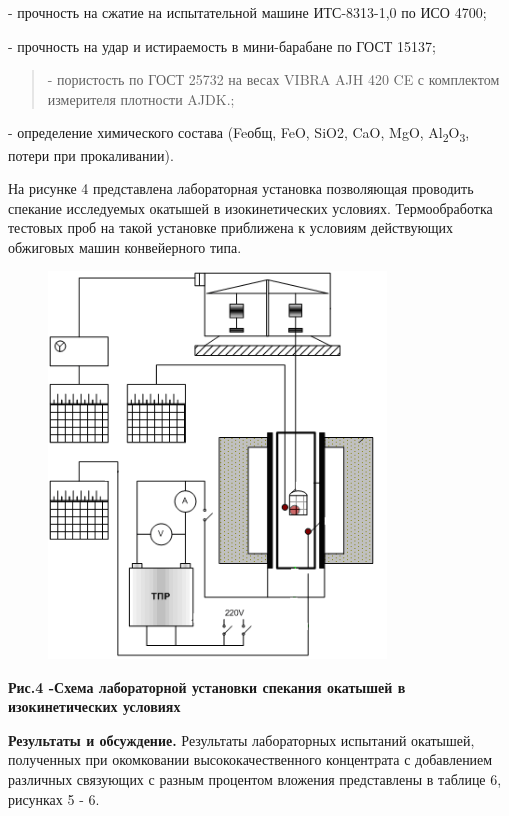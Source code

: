 - прочность на сжатие на испытательной машине ИТС-8313-1,0 по ИСО 4700;

- прочность на удар и истираемость в мини-барабане по ГОСТ 15137;

\begin{quote}
- пористость по ГОСТ 25732 на весах VIBRA AJH 420 CE с комплектом
измерителя плотности AJDK.;
\end{quote}

- определение химического состава (Feобщ, FeO, SiO2, CaO, MgO,
Al\textsubscript{2}O\textsubscript{3}, потери при прокаливании).

На рисунке 4 представлена лабораторная установка позволяющая проводить
спекание исследуемых окатышей в изокинетических условиях. Термообработка
тестовых проб на такой установке приближена к условиям действующих
обжиговых машин конвейерного типа.


\begin{figure}[H]
	\centering
	\includegraphics[width=0.8\textwidth]{media/chem2/image65}
	\caption*{}
\end{figure}


{\bfseries Рис.4 -Схема лабораторной установки спекания окатышей в
изокинетических условиях}

{\bfseries Результаты и обсуждение.} Результаты лабораторных испытаний
окатышей, полученных при окомковании высококачественного концентрата с
добавлением различных связующих с разным процентом вложения представлены
в таблице 6, рисунках 5 - 6.


